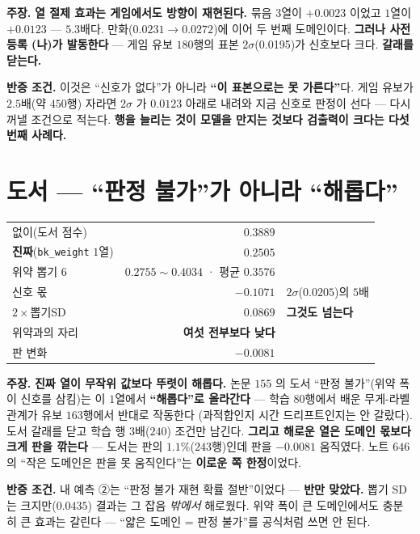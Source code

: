\documentclass[10pt,a4paper]{article}
\newcommand{\claim}[2]{\begin{claimbox}\textbf{주장.} #1\par\smallskip
  \textcolor{gray!70}{\textbf{반증 조건.} #2}\end{claimbox}}
\begin{document}
\claim{\textbf{열 절제 효과는 게임에서도 방향이 재현된다.} 묶음 $3$열이 $+0.0023$
이었고 $1$열이 $\mathbf{+0.0123}$ --- $5.3$배다. 만화($0.0231 \to 0.0272$)에 이어
두 번째 도메인이다. \textbf{그러나 사전등록 (나)가 발동한다} --- 게임 유보 $180$행의
표본 $2\sigma$(0.0195)가 신호보다 크다. \textbf{갈래를 닫는다.}}
{이것은 ``신호가 없다''가 아니라 \textbf{``이 표본으로는 못 가른다''}다. 게임
유보가 $2.5$배(약 $450$행) 자라면 $2\sigma$ 가 $0.0123$ 아래로 내려와 지금 신호로
판정이 선다 --- 다시 꺼낼 조건으로 적는다. \textbf{행을 늘리는 것이 모델을 만지는
것보다 검출력이 크다는 다섯 번째 사례다.}}

\section{도서 --- ``판정 불가''가 아니라 ``해롭다''}

\begin{center}
\begin{tabular}{lrl}
\toprule
없이(도서 점수) & $0.3889$ & \\
\textbf{진짜}(\texttt{bk\_weight} $1$열) & $\mathbf{0.2505}$ & \\
위약 뽑기 $6$ & $0.2755 \sim 0.4034$ · 평균 $0.3576$ & \\
\midrule
신호 몫 & $\mathbf{-0.1071}$ & $2\sigma$($0.0205$)의 $5$배 \\
$2\times$뽑기SD & $0.0869$ & \textbf{그것도 넘는다} \\
위약과의 자리 & \textcolor{BrickRed}{\textbf{여섯 전부보다 낮다}} & \\
판 변화 & $-0.0081$ & \\
\bottomrule
\end{tabular}
\end{center}

\claim{\textbf{진짜 열이 무작위 값보다 뚜렷이 해롭다.} 논문 $155$ 의 도서
``판정 불가''(위약 폭이 신호를 삼킴)는 이 $1$열에서 \textbf{``해롭다''로 올라간다}
--- 학습 $80$행에서 배운 무게-라벨 관계가 유보 $163$행에서 반대로 작동한다
(과적합인지 시간 드리프트인지는 안 갈랐다). 도서 갈래를 닫고 학습 행 $3$배($240$)
조건만 남긴다. \textbf{그리고 해로운 열은 도메인 몫보다 크게 판을 깎는다} ---
도서는 판의 $1.1\%$($243$행)인데 판을 $-0.0081$ 움직였다. 노트 $646$ 의 ``작은
도메인은 판을 못 움직인다''는 \textbf{이로운 쪽 한정}이었다.}
{내 예측 ②는 ``판정 불가 재현 확률 절반''이었다 --- \textbf{반만 맞았다.} 뽑기
SD 는 크지만($0.0435$) 결과는 그 잡음 \emph{밖에서} 해로웠다. 위약 폭이 큰
도메인에서도 충분히 큰 효과는 갈린다 --- ``얇은 도메인 = 판정 불가''를 공식처럼
쓰면 안 된다.}
\end{document}
